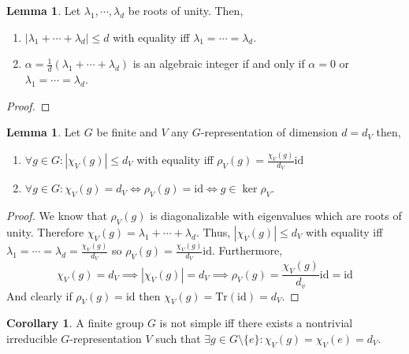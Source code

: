 \documentclass[12pt]{extarticle}
\newcommand{\sm}{\! \setminus \!}
\newcommand{\tr}[1]{\mathrm{Tr} \! \left(#1\right)}
\newcommand{\id}{\mathrm{id}}
\theoremstyle{definition}
\newtheorem{lemma}[theorem]{Lemma}
\newtheorem{corollary}[theorem]{Corollary}
\begin{document}
\begin{lemma}
Let $\lambda_1, \cdots, \lambda_d$ be roots of unity. Then,
\begin{enumerate}
\item $|\lambda_1 + \cdots + \lambda_d| \le d$ with equality iff $\lambda_1 = \cdots = \lambda_d$.
\item $\alpha = \frac{1}{d} (\lambda_1 + \cdots + \lambda_d)$ is an algebraic integer if and only if $\alpha = 0$ or $\lambda_1 = \cdots = \lambda_d$.
\end{enumerate}
\end{lemma}

\begin{proof}

\end{proof}

\begin{lemma}
Let $G$ be finite and $V$ any $G$-representation of dimension $d = d_V$ then,
\begin{enumerate}
\item $\forall g \in G : |\chi_V(g)| \le d_V$ with equality iff $\rho_V(g) = \frac{\chi_V(g)}{d_V} \id$
\item $\forall g \in G : \chi_V(g) = d_V \iff \rho_V(g) = \id \iff g \in \ker{\rho_V}$.
\end{enumerate}
\end{lemma}

\begin{proof}
We know that $\rho_V(g)$ is diagonalizable with eigenvalues which are roots of unity. Therefore $\chi_V(g) = \lambda_1 + \cdots + \lambda_d$. Thus, $|\chi_V(g)| \le d_V$ with equality iff $\lambda_1 = \cdots = \lambda_d = \frac{\chi_V(g)}{d_V}$ so $\rho_V(g) = \frac{\chi_V(g)}{d_V} \id$. Furthermore, 
\[\chi_V(g) = d_V \implies |\chi_V(g)| = d_V \implies \rho_V(g) = \frac{\chi_V(g)}{d_v} \id = \id\] 
And clearly if $\rho_V(g) = \id$ then $\chi_V(g) = \tr{\id} = d_V$. 
\end{proof}

\begin{corollary}
A finite group $G$ is not simple iff there exists a nontrivial irreducible $G$-representation $V$ such that $\exists g \in G \sm \{e\} : \chi_V(g) = \chi_V(e) = d_V$. 
\end{corollary}
\end{document}
